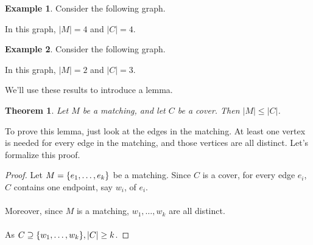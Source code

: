 \documentclass[]{article}
\newtheorem*{theorem}{Theorem}
\theoremstyle{definition}
\newtheorem{ex}{Example}[section]
\DeclarePairedDelimiter{\set}{\lbrace}{\rbrace}
\begin{document}
			\begin{ex}
				Consider the following graph.
				\begin{center}
				\end{center}

				In this graph, $|M| = 4$ and $|C| = 4$.
			\end{ex}


			\begin{ex}
				Consider the following graph.
				\begin{center}
				\end{center}

				In this graph, $|M| = 2$ and $|C| = 3$.
			\end{ex}

			We'll use these results to introduce a lemma.

			\begin{theorem}
				Let $M$ be a matching, and let $C$ be a cover. Then $|M| \le |C|$.
			\end{theorem}

			To prove this lemma, just look at the edges in the matching. At least one vertex is needed for every edge in the matching, and those vertices are all distinct. Let's formalize this proof.

			\begin{proof}
				Let $M = \set{e_1, \ldots, e_k}$ be a matching. Since $C$ is a cover, for every edge $e_i$, $C$ contains one endpoint, say $w_i$, of $e_i$.
				\\ \\
				Moreover, since $M$ is a matching, $w_1, \ldots, w_k$ are all distinct.
				\\ \\
				As $C \supseteq \set{w_1, \ldots, w_k}, |C| \ge k$.
			\end{proof}
\end{document}
